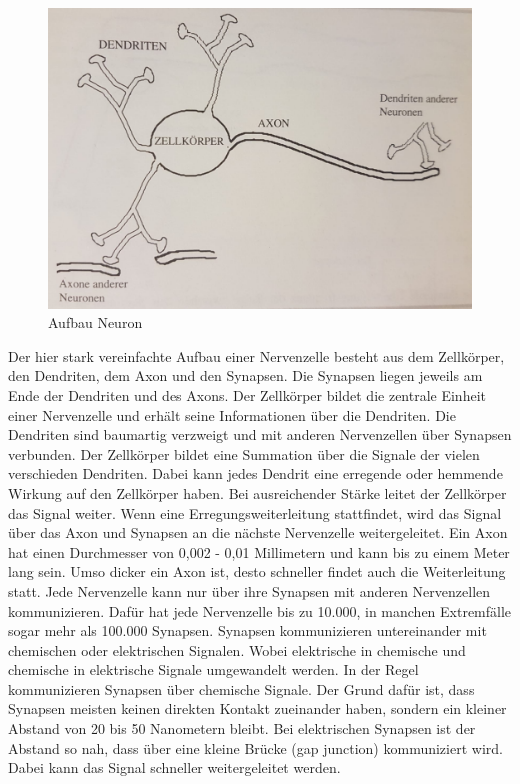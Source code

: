 \begin{figure}[hbt]
	\centering
	\includegraphics[width=0.9\linewidth]{./Bilder/Aufbau_Nervenzelle_Mazzetti}
	\caption{Aufbau Neuron \cite[S. 11]{Mazzetti1996}}
	\label{fig:AufbauNeuron}
\end{figure}

Der hier stark vereinfachte Aufbau einer Nervenzelle besteht aus dem Zellkörper, den Dendriten, dem Axon und den Synapsen. Die Synapsen liegen jeweils am Ende der Dendriten und des Axons. Der Zellkörper bildet die zentrale Einheit einer Nervenzelle und erhält seine Informationen über die Dendriten. Die Dendriten sind baumartig verzweigt und mit anderen Nervenzellen über Synapsen verbunden. Der Zellkörper bildet eine Summation über die Signale der vielen verschieden Dendriten. Dabei kann jedes Dendrit eine erregende oder hemmende Wirkung auf den Zellkörper haben. Bei ausreichender Stärke leitet der Zellkörper das Signal weiter. Wenn eine Erregungsweiterleitung stattfindet, wird das Signal über das Axon und Synapsen an die nächste Nervenzelle weitergeleitet. Ein Axon hat einen Durchmesser von 0,002 - 0,01 Millimetern und kann bis zu einem Meter lang sein.\cite{gehirnlernen.de} Umso dicker ein Axon ist, desto schneller findet auch die Weiterleitung statt. Jede Nervenzelle kann nur über ihre Synapsen mit anderen Nervenzellen kommunizieren. Dafür hat jede Nervenzelle bis zu 10.000, in manchen Extremfälle sogar mehr als 100.000 Synapsen.\cite{dasgehirn.info} Synapsen kommunizieren untereinander mit chemischen oder elektrischen Signalen. Wobei elektrische in chemische und chemische in elektrische Signale umgewandelt werden. In der Regel kommunizieren Synapsen über chemische Signale. Der Grund dafür ist, dass Synapsen meisten keinen direkten Kontakt zueinander haben, sondern ein kleiner Abstand von 20 bis 50 Nanometern bleibt.\cite{dasgehirn.info} Bei elektrischen Synapsen ist der Abstand so nah, dass über eine kleine Brücke (gap junction) kommuniziert wird. Dabei kann das Signal schneller weitergeleitet werden.\cite{gehirnlernen.de}

